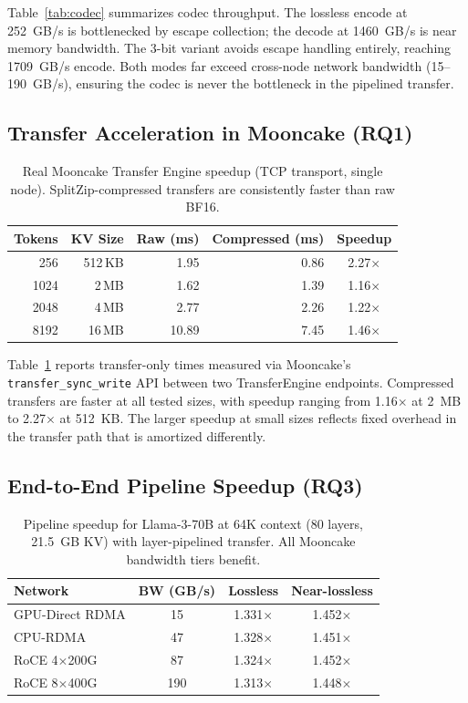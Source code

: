 Table~\ref{tab:codec} summarizes codec throughput. The lossless encode at 252~GB/s is bottlenecked by escape collection; the decode at 1460~GB/s is near memory bandwidth. The 3-bit variant avoids escape handling entirely, reaching 1709~GB/s encode. Both modes far exceed cross-node network bandwidth (15--190~GB/s), ensuring the codec is never the bottleneck in the pipelined transfer.

\subsection{Transfer Acceleration in Mooncake (RQ1)}

\begin{table}[t]
\centering
\small
\caption{Real Mooncake Transfer Engine speedup (TCP transport, single node). SplitZip-compressed transfers are consistently faster than raw BF16.}
\label{tab:mooncake}
\begin{tabular}{rrrrc}
\toprule
Tokens & KV Size & Raw (ms) & Compressed (ms) & Speedup \\
\midrule
256 & 512\,KB & 1.95 & 0.86 & 2.27$\times$ \\
1024 & 2\,MB & 1.62 & 1.39 & 1.16$\times$ \\
2048 & 4\,MB & 2.77 & 2.26 & 1.22$\times$ \\
8192 & 16\,MB & 10.89 & 7.45 & 1.46$\times$ \\
\bottomrule
\end{tabular}
\end{table}

Table~\ref{tab:mooncake} reports transfer-only times measured via Mooncake's \texttt{transfer\_sync\_write} API between two TransferEngine endpoints. Compressed transfers are faster at all tested sizes, with speedup ranging from 1.16$\times$ at 2~MB to 2.27$\times$ at 512~KB. The larger speedup at small sizes reflects fixed overhead in the transfer path that is amortized differently.

\subsection{End-to-End Pipeline Speedup (RQ3)}

\begin{table}[t]
\centering
\small
\caption{Pipeline speedup for Llama-3-70B at 64K context (80 layers, 21.5~GB KV) with layer-pipelined transfer. All Mooncake bandwidth tiers benefit.}
\label{tab:pipeline}
\begin{tabular}{lccc}
\toprule
Network & BW (GB/s) & Lossless & Near-lossless \\
\midrule
GPU-Direct RDMA & 15 & 1.331$\times$ & 1.452$\times$ \\
CPU-RDMA & 47 & 1.328$\times$ & 1.451$\times$ \\
RoCE 4$\times$200G & 87 & 1.324$\times$ & 1.452$\times$ \\
RoCE 8$\times$400G & 190 & 1.313$\times$ & 1.448$\times$ \\
\bottomrule
\end{tabular}
\end{table}

